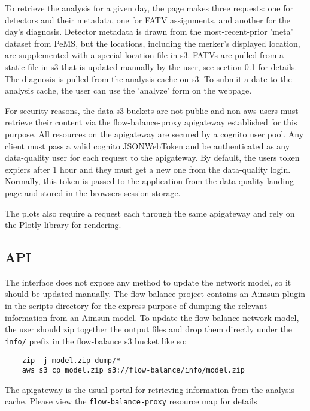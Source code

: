 \documentclass[titlepage]{article}
\begin{document}
To retrieve the analysis for a given day, the page makes three requests: one for detectors and their metadata, one for FATV assignments, and another for the day's diagnosis. Detector metadata is drawn from the most-recent-prior 'meta' dataset from PeMS, but the locations, including the merker's displayed location, are supplemented with a special location file in s3. FATVs are pulled from a static file in s3 that is updated manually by the user, see section \ref{api} for details. The diagnosis is pulled from the analysis cache on s3. To submit a date to the analysis cache, the user can use the 'analyze' form on the webpage.

For security reasons, the data s3 buckets are not public and non aws users must retrieve their content via the flow-balance-proxy apigateway established for this purpose. All resources on the apigateway are secured by a cognito user pool. Any client must pass a valid cognito JSONWebToken and be authenticated as any data-quality user for each request to the apigateway. By default, the users token expiers after 1 hour and they must get a new one from the data-quality login. Normally, this token is passed to the application from the data-quality landing page and stored in the browsers session storage.

The plots also require a request each through the same apigateway and rely on the Plotly library for rendering.

\subsection{API}\label{api}
The interface does not expose any method to update the network model, so it should be updated manually. The flow-balance project contains an Aimsun plugin in the scripts directory for the express purpose of dumping the relevant information from an Aimsun model. To update the flow-balance network model, the user should zip together the output files and drop them directly under the \texttt{info/} prefix in the flow-balance s3 bucket like so:

\begin{lstlisting}
	zip -j model.zip dump/*
	aws s3 cp model.zip s3://flow-balance/info/model.zip
\end{lstlisting}

The apigateway is the usual portal for retrieving information from the analysis cache. Please view the \texttt{flow-balance-proxy} resource map for details
\end{document}
